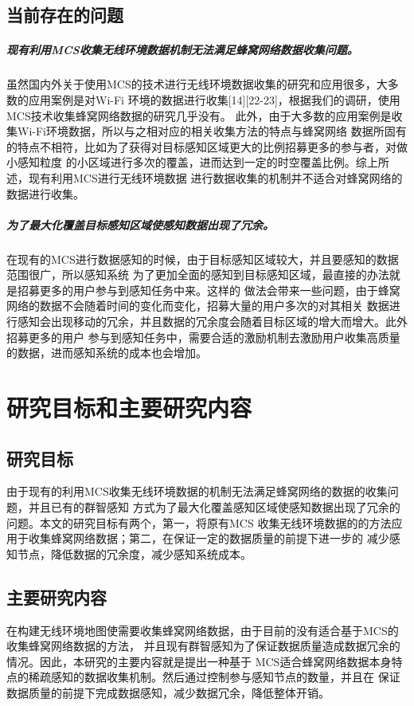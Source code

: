 \documentclass[UTF8]{ctexart}
\begin{document}
\subsection{当前存在的问题}
\subparagraph{现有利用MCS收集无线环境数据机制无法满足蜂窝网络数据收集问题。}
虽然国内外关于使用MCS的技术进行无线环境数据收集的研究和应用很多，大多数的应用案例是对Wi-Fi
环境的数据进行收集[14][22-23]，根据我们的调研，使用MCS技术收集蜂窝网络数据的研究几乎没有。
此外，由于大多数的应用案例是收集Wi-Fi环境数据，所以与之相对应的相关收集方法的特点与蜂窝网络
数据所固有的特点不相符，比如为了获得对目标感知区域更大的比例招募更多的参与者，对做小感知粒度
的小区域进行多次的覆盖，进而达到一定的时空覆盖比例。综上所述，现有利用MCS进行无线环境数据
进行数据收集的机制并不适合对蜂窝网络的数据进行收集。

\subparagraph{为了最大化覆盖目标感知区域使感知数据出现了冗余。}
在现有的MCS进行数据感知的时候，由于目标感知区域较大，并且要感知的数据范围很广，所以感知系统
为了更加全面的感知到目标感知区域，最直接的办法就是招募更多的用户参与到感知任务中来。这样的
做法会带来一些问题，由于蜂窝网络的数据不会随着时间的变化而变化，招募大量的用户多次的对其相关
数据进行感知会出现移动的冗余，并且数据的冗余度会随着目标区域的增大而增大。此外招募更多的用户
参与到感知任务中，需要合适的激励机制去激励用户收集高质量的数据，进而感知系统的成本也会增加。

\section{研究目标和主要研究内容}
\subsection{研究目标}
由于现有的利用MCS收集无线环境数据的机制无法满足蜂窝网络的数据的收集问题，并且已有的群智感知
方式为了最大化覆盖感知区域使感知数据出现了冗余的问题。本文的研究目标有两个，第一，将原有MCS
收集无线环境数据的的方法应用于收集蜂窝网络数据；第二，在保证一定的数据质量的前提下进一步的
减少感知节点，降低数据的冗余度，减少感知系统成本。

\subsection{主要研究内容}
在构建无线环境地图使需要收集蜂窝网络数据，由于目前的没有适合基于MCS的收集蜂窝网络数据的方法，
并且现有群智感知为了保证数据质量造成数据冗余的情况。因此，本研究的主要内容就是提出一种基于
MCS适合蜂窝网络数据本身特点的稀疏感知的数据收集机制。然后通过控制参与感知节点的数量，并且在
保证数据质量的前提下完成数据感知，减少数据冗余，降低整体开销。
\end{document}
